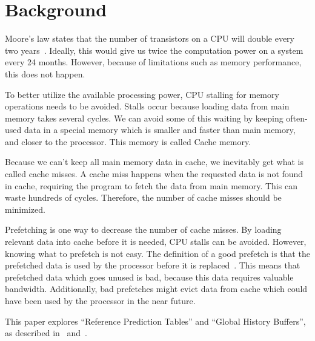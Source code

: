 \section{Background} %


Moore's law states that the number of transistors on a CPU will double
every two years~\cite{moore}. Ideally, this would give us twice the
computation power on a system every 24 months. However, because of
limitations such as memory performance, this does not happen.

To better utilize the available processing power, CPU stalling for
memory operations needs to be avoided. Stalls occur because loading
data from main memory takes several cycles. We can avoid some of this
waiting by keeping often-used data in a special memory which is
smaller and faster than main memory, and closer to the processor. This
memory is called Cache memory.

Because we can't keep all main memory data in cache, we inevitably get
what is called cache misses. A cache miss happens when the requested
data is not found in cache, requiring the program to fetch the data
from main memory. This can waste hundreds of cycles. Therefore, the
number of cache misses should be minimized.

Prefetching is one way to decrease the number of cache misses. By
loading relevant data into cache before it is needed, CPU stalls can
be avoided. However, knowing what to prefetch is not easy. The
definition of a good prefetch is that the prefetched data is used by
the processor before it is
replaced~\cite{srinivasan_davidson_tyson_2004}. This means that
prefetched data which goes unused is bad, because this data requires
valuable bandwidth. Additionally, bad prefetches might evict data from
cache which could have been used by the processor in the near future.

This paper explores ``Reference Prediction Tables'' and ``Global
History Buffers'', as described in~\cite{chen_baer_1995}
and~\cite{nesbit_smith_2005}.

